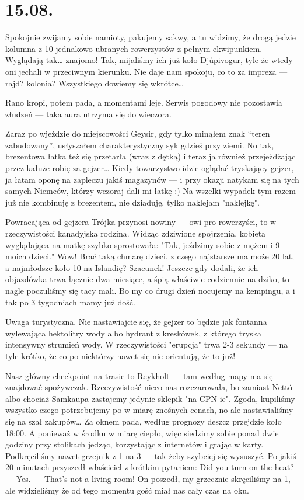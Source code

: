 \chapter {15.08.}

Spokojnie zwijamy sobie namioty, pakujemy sakwy, a tu widzimy, że drogą jedzie kolumna z 10 jednakowo ubranych rowerzystów z pełnym ekwipunkiem. Wyglądają tak… znajomo! Tak, mijaliśmy ich już koło Djúpivogur, tyle że wtedy oni jechali w przeciwnym kierunku. Nie daje nam spokoju, co to za impreza --- rajd? kolonia? Wszystkiego dowiemy się wkrótce…

Rano kropi, potem pada, a momentami leje. Serwis pogodowy nie pozostawia złudzeń --- taka aura utrzyma się do wieczora.

Zaraz po wjeździe do miejscowości Geysir, gdy tylko minąłem znak “teren zabudowany”, usłyszałem charakterystyczny syk gdzieś przy ziemi. No tak, brezentowa łatka też się przetarła (wraz z dętką) i teraz ja również przejeżdżając przez kałuże robię za gejzer…  Kiedy towarzystwo idzie oglądać tryskający gejzer, ja łatam oponę na zapleczu jakiś magazynów --- i przy okazji natykam się na tych samych Niemców, którzy wczoraj dali mi łatkę :) Na wszelki wypadek tym razem już nie kombinuję z brezentem, nie dziaduję, tylko naklejam "naklejkę".

Powracająca od gejzera Trójka przynosi nowiny --- owi pro-rowerzyści, to w rzeczywistości kanadyjska rodzina. Widząc zdziwione spojrzenia, kobieta wyglądająca na matkę szybko sprostowała: "Tak, jeździmy sobie z mężem i 9 moich dzieci." Wow! Brać taką chmarę dzieci, z czego najstarsze ma może 20 lat, a najmłodsze koło 10 na Islandię? Szacunek! Jeszcze gdy dodali, że ich objazdówka trwa łącznie dwa miesiące, a śpią właściwie codziennie na dziko, to nagle poczuliśmy się tacy mali. Bo my co drugi dzień nocujemy na kempingu, a i tak po 3 tygodniach mamy już dość.

Uwaga turystyczna. Nie nastawiajcie się, że gejzer to będzie jak fontanna wylewająca hektolitry wody albo hydrant z kreskówek, z którego tryska intensywny strumień wody. W rzeczywistości "erupcja" trwa 2-3 sekundy --- na tyle krótko, że co po niektórzy nawet się nie orientują, że to już!

Nasz główny checkpoint na trasie to Reykholt --- tam według mapy ma się znajdować spożywczak. Rzeczywistość nieco nas rozczarowała, bo zamiast Nettó albo chociaż Samkaupa zastajemy jedynie sklepik "na CPN-ie". Zgoda, kupiliśmy wszystko czego potrzebujemy po w miarę znośnych cenach, no ale nastawialiśmy się na szał zakupów… Za oknem pada, według prognozy deszcz przejdzie koło 18:00. A ponieważ w środku w miarę ciepło, więc siedzimy sobie ponad dwie godziny przy stolikach jedząc, korzystając z internetów i grając w karty. Podkręciliśmy nawet grzejnik z 1 na 3 --- tak żeby szybciej się wysuszyć. Po jakiś 20 minutach przyszedł właściciel z krótkim pytaniem: Did you turn on the heat? --- Yes. --- That’s not a living room! On poszedł, my grzecznie skręciliśmy na 1, ale widzieliśmy że od tego momentu gość miał nas cały czas na oku.

